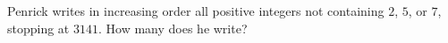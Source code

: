 Penrick writes in increasing order all positive integers not containing $2$, $5$, or $7$, stopping at $3141$. How many does he write?
